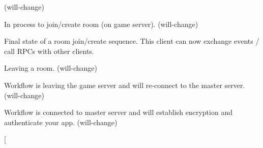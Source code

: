 \begin{Desc}
\begin{description}
(will-\/change)\item[{\em 
Joining\hypertarget{group__public_api_gga91cc003c03acb26c6f1530440ebdbc88af6807db4ae3a5c82b99bced82a0ca92b}{}\label{group__public_api_gga91cc003c03acb26c6f1530440ebdbc88af6807db4ae3a5c82b99bced82a0ca92b}
}]In process to join/create room (on game server). (will-\/change)\item[{\em 
Joined\hypertarget{group__public_api_gga91cc003c03acb26c6f1530440ebdbc88a7d50c09f1ad7d098e0a847bcdcab7efb}{}\label{group__public_api_gga91cc003c03acb26c6f1530440ebdbc88a7d50c09f1ad7d098e0a847bcdcab7efb}
}]Final state of a room join/create sequence. This client can now exchange events / call R\+P\+Cs with other clients.\item[{\em 
Leaving\hypertarget{group__public_api_gga91cc003c03acb26c6f1530440ebdbc88aa9c7b1d7219fa9d3de551ba5bc639eb6}{}\label{group__public_api_gga91cc003c03acb26c6f1530440ebdbc88aa9c7b1d7219fa9d3de551ba5bc639eb6}
}]Leaving a room. (will-\/change)\item[{\em 
Disconnecting\+From\+Gameserver\hypertarget{group__public_api_gga91cc003c03acb26c6f1530440ebdbc88ac2b8e7a526f5bdbd0ca4e42a1fc87fdf}{}\label{group__public_api_gga91cc003c03acb26c6f1530440ebdbc88ac2b8e7a526f5bdbd0ca4e42a1fc87fdf}
}]Workflow is leaving the game server and will re-\/connect to the master server. (will-\/change)\item[{\em 
Connecting\+To\+Masterserver\hypertarget{group__public_api_gga91cc003c03acb26c6f1530440ebdbc88a6bfd906f466d549d660a2e7356ac58dd}{}\label{group__public_api_gga91cc003c03acb26c6f1530440ebdbc88a6bfd906f466d549d660a2e7356ac58dd}
}]Workflow is connected to master server and will establish encryption and authenticate your app. (will-\/change)\item[{\em 
}
\end{description}
\end{Desc}
